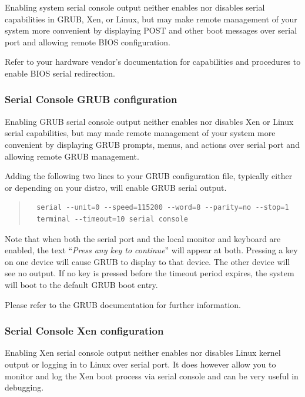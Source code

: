 \documentclass[11pt,twoside,final,openright]{report}
\begin{document}
Enabling system serial console output neither enables nor disables
serial capabilities in GRUB, Xen, or Linux, but may make remote
management of your system more convenient by displaying POST and other
boot messages over serial port and allowing remote BIOS configuration.

Refer to your hardware vendor's documentation for capabilities and
procedures to enable BIOS serial redirection.


\subsubsection{Serial Console GRUB configuration}

Enabling GRUB serial console output neither enables nor disables Xen or
Linux serial capabilities, but may made remote management of your system
more convenient by displaying GRUB prompts, menus, and actions over
serial port and allowing remote GRUB management.

Adding the following two lines to your GRUB configuration file,
typically either  or 
depending on your distro, will enable GRUB serial output.

\begin{quote} 
{\small \begin{verbatim}
  serial --unit=0 --speed=115200 --word=8 --parity=no --stop=1
  terminal --timeout=10 serial console
\end{verbatim}}
\end{quote}

Note that when both the serial port and the local monitor and keyboard
are enabled, the text ``\emph{Press any key to continue}'' will appear
at both.  Pressing a key on one device will cause GRUB to display to
that device.  The other device will see no output.  If no key is
pressed before the timeout period expires, the system will boot to the
default GRUB boot entry.

Please refer to the GRUB documentation for further information.


\subsubsection{Serial Console Xen configuration}

Enabling Xen serial console output neither enables nor disables Linux
kernel output or logging in to Linux over serial port.  It does however
allow you to monitor and log the Xen boot process via serial console and
can be very useful in debugging.
\end{document}
